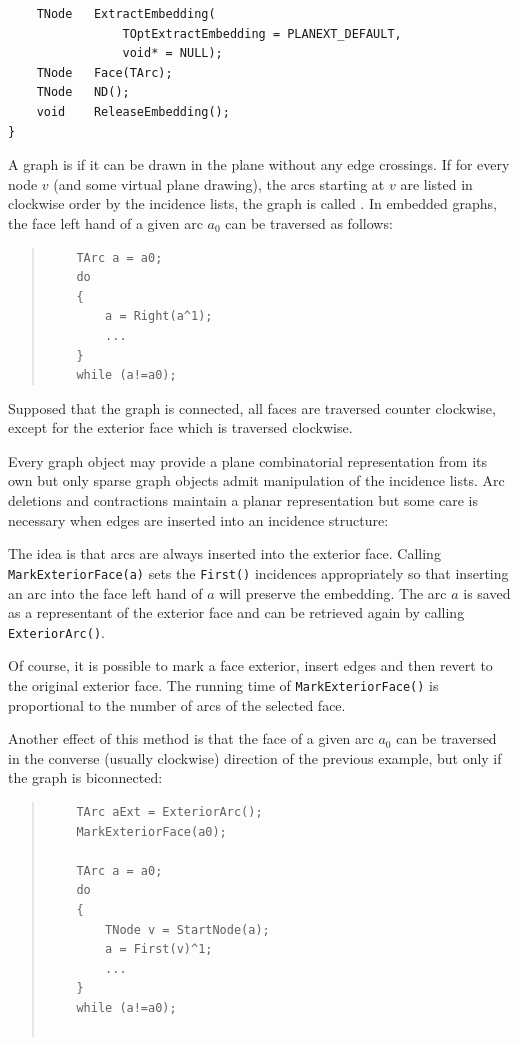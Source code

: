 \documentclass[a4paper,11pt,twoside]{book}
\begin{document}
\begin{multicols}{2}
\begin{mymethods}
\begin{verbatim}
    TNode   ExtractEmbedding(
                TOptExtractEmbedding = PLANEXT_DEFAULT,
                void* = NULL);
    TNode   Face(TArc);
    TNode   ND();
    void    ReleaseEmbedding();
}
\end{verbatim}
\end{mymethods}
A graph is  if it can be drawn in the plane without any edge
crossings. If for every node $v$ (and some virtual plane drawing), the arcs
starting at $v$ are listed in clockwise order by the incidence lists, the graph
is called . In embedded graphs, the face left
hand of a given arc $a_0$ can be traversed as follows:
\sample
\begin{quote}
\begin{verbatim}
    TArc a = a0;
    do
    {
        a = Right(a^1);
        ...
    }
    while (a!=a0);
\end{verbatim}
\end{quote}
Supposed that the graph is connected, all faces are traversed counter clockwise,
except for the exterior face which is traversed clockwise.

Every graph object may provide a plane combinatorial representation from its own
but only sparse graph objects admit manipulation of the incidence lists. Arc
deletions and contractions maintain a planar representation but some care is
necessary when edges are inserted into an incidence structure:

The idea is that arcs are always inserted into the exterior face.
Calling \verb/MarkExteriorFace(a)/ sets the \verb/First()/ incidences
appropriately so that inserting an arc into the face left hand of $a$
will preserve the embedding. The arc $a$ is saved as a representant of the
exterior face and can be retrieved again by calling \verb/ExteriorArc()/.

Of course, it is possible to mark a face exterior, insert edges and then
revert to the original exterior face. The running time of
\verb/MarkExteriorFace()/ is proportional to the number of arcs of the
selected face.

Another effect of this method is that the face of a given arc $a_0$ can be
traversed in the converse (usually clockwise) direction of the previous example,
but only if the graph is biconnected:
\sample
\begin{quote}
\begin{verbatim}
    TArc aExt = ExteriorArc();
    MarkExteriorFace(a0);

    TArc a = a0;
    do
    {
        TNode v = StartNode(a);
        a = First(v)^1;
        ...
    }
    while (a!=a0);


\end{verbatim}
\end{quote}
\end{multicols}
\end{document}
